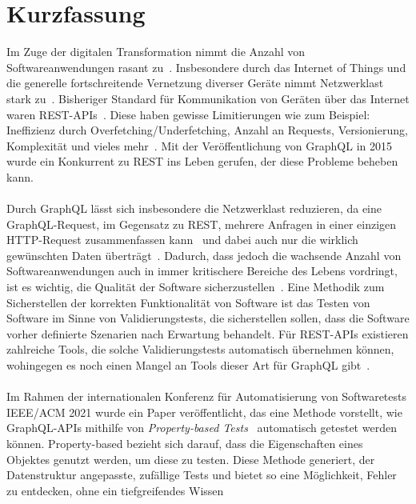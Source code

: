 \chapter{Kurzfassung}

Im Zuge der digitalen Transformation nimmt die Anzahl von Softwareanwendungen rasant zu~\cite{digitale-transformation}.
Insbesondere durch das Internet of Things und die generelle fortschreitende Vernetzung diverser Geräte nimmt Netzwerklast stark zu~\cite{iot-traffic}.
Bisheriger Standard für Kommunikation von Geräten über das Internet waren REST-APIs~\cite[vgl. Introduction]{hygraph}.
Diese haben gewisse Limitierungen wie zum Beispiel: Ineffizienz durch Overfetching/Underfetching, Anzahl an Requests, Versionierung, Komplexität und vieles mehr~\cite{hygraph}.
Mit der Veröffentlichung von GraphQL in 2015 wurde ein Konkurrent zu REST ins Leben gerufen, der diese Probleme beheben kann.
\\
\\
Durch GraphQL lässt sich insbesondere die Netzwerklast reduzieren, da eine GraphQL-Request, im Gegensatz zu REST, mehrere Anfragen in einer einzigen HTTP-Request zusammenfassen kann~\cite{awsrestgraphql}
und dabei auch nur die wirklich gewünschten Daten überträgt~\cite[vgl. Advantages of GraphQL APIs]{hygraph}.
Dadurch, dass jedoch die wachsende Anzahl von Softwareanwendungen auch in immer kritischere Bereiche des Lebens vordringt, ist es wichtig, die Qualität der Software sicherzustellen~\cite[S. 16]{software-testing}.
Eine Methodik zum Sicherstellen der korrekten Funktionalität von Software ist das Testen von Software im Sinne von Validierungstests, die sicherstellen sollen, dass die Software vorher definierte Szenarien nach Erwartung behandelt.
Für REST-APIs existieren zahlreiche Tools, die solche Validierungstests automatisch übernehmen können, wohingegen es noch einen Mangel an Tools dieser Art für GraphQL gibt~\cite[vgl. Introduction]{property-based-testing}.
\\
\\
Im Rahmen der internationalen Konferenz für Automatisierung von Softwaretests IEEE/ACM 2021 wurde ein Paper veröffentlicht, das eine Methode vorstellt, wie GraphQL-APIs mithilfe von
\textit{Property-based Tests}~\cite{property-based-testing} automatisch getestet werden können.
Property-based bezieht sich darauf, dass die Eigenschaften eines Objektes genutzt werden, um diese zu testen.
Diese Methode generiert, der Datenstruktur angepasste, zufällige Tests und bietet so eine Möglichkeit, Fehler zu entdecken, ohne ein tiefgreifendes Wissen
